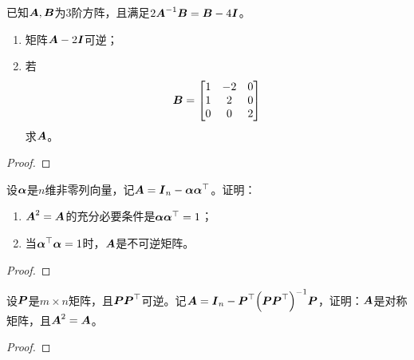 \begin{problem}
已知\(\boldsymbol{A},\boldsymbol{B}\)为\(3\)阶方阵，且满足\(2{\boldsymbol{A}}^{-1}\boldsymbol{B}=\boldsymbol{B}-4\boldsymbol{I}\)。
\begin{enumerate}
    \item 矩阵\(\boldsymbol{A}-2\boldsymbol{I}\)可逆；
    \item 若
          \begin{equation*}
              \boldsymbol{B}=
              \begin{bmatrix}
                  1 & -2 & 0 \\
                  1 & 2  & 0 \\
                  0 & 0  & 2
              \end{bmatrix}
          \end{equation*}
          求\(\boldsymbol{A}\)。
\end{enumerate}
\end{problem}
\begin{proof}

\end{proof}

\begin{problem}
设\(\boldsymbol{\alpha}\)是\(n\)维非零列向量，记\(\boldsymbol{A}=\boldsymbol{I}_n-\boldsymbol{\alpha}\boldsymbol{\alpha}^\top\)。证明：
\begin{enumerate}
    \item \(\boldsymbol{A}^2=\boldsymbol{A}\)的充分必要条件是\(\boldsymbol{\alpha}\boldsymbol{\alpha}^\top=1\)；
    \item 当\(\boldsymbol{\alpha}^\top\boldsymbol{\alpha}=1\)时，\(\boldsymbol{A}\)是不可逆矩阵。
\end{enumerate}
\end{problem}
\begin{proof}

\end{proof}

\begin{problem}
设\(\boldsymbol{P}\)是\(m\times n\)矩阵，且\(\boldsymbol{P}\boldsymbol{P}^\top\)可逆。记\(\boldsymbol{A}=\boldsymbol{I}_n-\boldsymbol{P}^\top{\left( \boldsymbol{P}\boldsymbol{P}^\top \right)}^{-1}\boldsymbol{P}\)，证明：\(\boldsymbol{A}\)是对称矩阵，且\(\boldsymbol{A}^2=\boldsymbol{A}\)。
\end{problem}
\begin{proof}

\end{proof}

